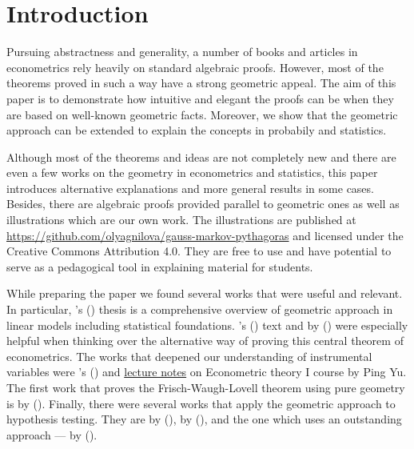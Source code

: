 \section{Introduction}

\begin{fullwidth}

Pursuing abstractness and generality, a number of books and articles in
econometrics rely heavily on standard algebraic proofs.
However, most of the theorems proved in such a way have a strong geometric appeal.
The aim of this paper is to demonstrate how intuitive and elegant the proofs
can be when they are based on well-known geometric facts.
Moreover, we show that the geometric approach can be extended to explain
the concepts in probabily and statistics.

Although most of the theorems and ideas are not completely new and
there are even a few works on the geometry in econometrics and statistics,
this paper introduces alternative explanations and more general results in some cases.
Besides, there are algebraic proofs provided parallel to geometric ones
as well as illustrations which are our own work. 
The illustrations are published at \url{https://github.com/olyagnilova/gauss-markov-pythagoras} and licensed under the
Creative Commons Attribution 4.0. %
They are free to use and have potential to serve as a pedagogical tool
in explaining material for students.

While preparing the paper we found several works that were useful and relevant.
In particular, \citeauthor{jacobson}'s (\citeyear{jacobson}) thesis 
is a comprehensive overview of geometric approach in linear models including
statistical foundations.
\citeauthor{gmt_blue}’s (\citeyear{gmt_blue}) text  and
 by
\citeauthor{gmt_american_statistician} (\citeyear{gmt_american_statistician}) were especially helpful when thinking over
the alternative way of proving this central theorem of econometrics.
The works that deepened our understanding of instrumental variables were
\citeauthor{Butler2016}'s (\citeyear{Butler2016}) 
and \href{http://web.hku.hk/~pingyu/6005/6005.htm}{lecture notes} on Econometric theory I course by Ping Yu.
The first work that proves the Frisch-Waugh-Lovell theorem using pure geometry
is  by
\citeauthor{fwl} (\citeyear{fwl}).
Finally, there were several works that apply the geometric approach to
hypothesis testing. They are
by \citeauthor{Langsrud2004} (\citeyear{Langsrud2004}),
by \citeauthor{Siniksaran2005} (\citeyear{Siniksaran2005}),
and the one which uses an outstanding approach —
by \citeauthor{friendly2013} (\citeyear{friendly2013}).


\end{fullwidth}
